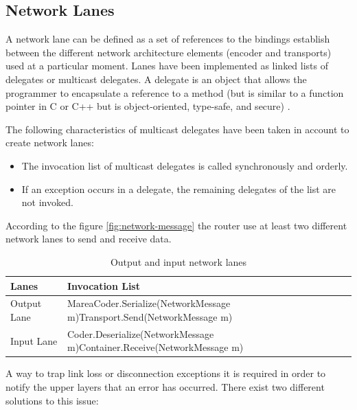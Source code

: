 \subsection{Network Lanes}\label{SS:Network-Lanes}

A network lane can be defined as a set of references to the bindings establish between the different network architecture elements (encoder and transports) used at a particular moment. Lanes have been implemented as linked lists of delegates or multicast delegates. A delegate is an object that allows the programmer to encapsulate a reference to a method (but is similar to a function pointer in C or C++ but is object-oriented, type-safe, and secure) \cite{cite:delegate}.

The following characteristics of multicast delegates have been taken in account to create network lanes:

\begin{itemize}
\item The invocation list of multicast delegates is called synchronously and orderly.
\item If an exception occurs in a delegate, the remaining delegates of the list are not invoked.
\end{itemize}

According to the figure \ref{fig:network-message} the router use at least two different network lanes to send and receive data.

\begin{table}[H]
\begin{center}
\caption{\nohyphens{Output and input network lanes}}
\label{T:Lanes}
\begin{tabular}{|l|p{7.3cm}|}
\hline
 {\bf Lanes} & {\bf Invocation List} 												\\ \hline \hline
 Output Lane & MareaCoder.Serialize(NetworkMessage m)\newline Transport.Send(NetworkMessage m)\\ \hline
 Input Lane & Coder.Deserialize(NetworkMessage m)\newline Container.Receive(NetworkMessage m)\\ \hline
\end{tabular}
\end{center}
\end{table}

A way to trap link loss or disconnection exceptions it is required in order to notify the upper layers that an error has occurred. There exist two different solutions to this issue:

